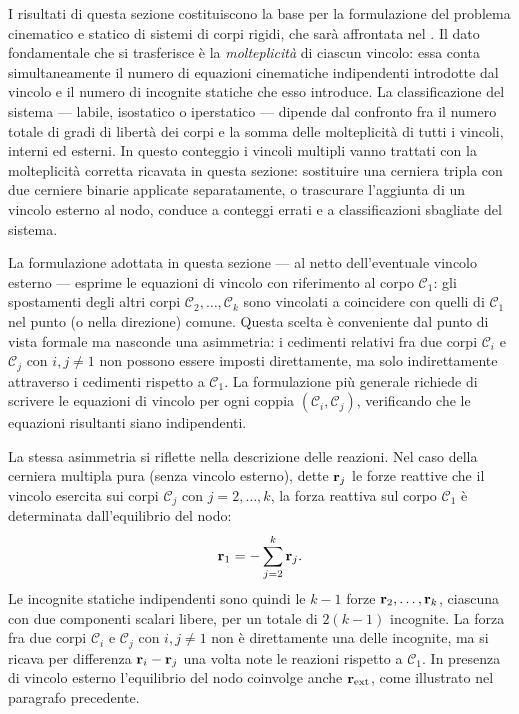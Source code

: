 \begin{oss}
	I risultati di questa sezione costituiscono la base
	per la formulazione del problema cinematico e statico
	di sistemi di corpi rigidi, che sarà affrontata nel
	. Il dato fondamentale
	che si trasferisce è la \emph{molteplicità} di ciascun
	vincolo: essa conta simultaneamente il numero di
	equazioni cinematiche indipendenti introdotte dal
	vincolo e il numero di incognite statiche che esso
	introduce. La classificazione del sistema --- labile,
	isostatico o iperstatico --- dipende dal confronto fra
	il numero totale di gradi di libertà dei corpi e la
	somma delle molteplicità di tutti i vincoli, interni
	ed esterni. In questo conteggio i vincoli multipli vanno
	trattati con la molteplicità corretta ricavata in
	questa sezione: sostituire una cerniera tripla con due
	cerniere binarie applicate separatamente, o trascurare
	l'aggiunta di un vincolo esterno al nodo, conduce a
	conteggi errati e a classificazioni sbagliate del
	sistema.
\end{oss}

\begin{oss}
	La formulazione adottata in questa sezione --- al netto
	dell'eventuale vincolo esterno --- esprime le equazioni
	di vincolo con riferimento al corpo $\mathcal{C}_1$:
	gli spostamenti degli altri corpi
	$\mathcal{C}_2, \ldots, \mathcal{C}_k$ sono vincolati
	a coincidere con quelli di $\mathcal{C}_1$ nel punto
	(o nella direzione) comune. Questa scelta è conveniente
	dal punto di vista formale ma nasconde una asimmetria:
	i cedimenti relativi fra due corpi $\mathcal{C}_i$ e
	$\mathcal{C}_j$ con $i,j \neq 1$ non possono essere
	imposti direttamente, ma solo indirettamente attraverso
	i cedimenti rispetto a $\mathcal{C}_1$. La formulazione
	più generale richiede di scrivere le equazioni di
	vincolo per ogni coppia $(\mathcal{C}_i, \mathcal{C}_j)$,
	verificando che le equazioni risultanti siano
	indipendenti.
	
	La stessa asimmetria si riflette nella descrizione delle
	reazioni. Nel caso della cerniera multipla pura (senza
	vincolo esterno), dette $\mathbf{r}_j$ le forze reattive che il
	vincolo esercita sui corpi $\mathcal{C}_j$ con $j = 2,
	\ldots, k$, la forza reattiva sul corpo $\mathcal{C}_1$
	è determinata dall'equilibrio del nodo:
	\begin{equation}
		\mathbf{r}_1 = -\sum_{j=2}^{k} \mathbf{r}_j.
	\end{equation}
	Le incognite statiche indipendenti sono quindi le $k-1$
	forze $\mathbf{r}_2, \ldots, \mathbf{r}_k$, ciascuna con due
	componenti scalari libere, per un totale di $2(k-1)$
	incognite. La forza fra due corpi $\mathcal{C}_i$ e
	$\mathcal{C}_j$ con $i,j \neq 1$ non è direttamente una
	delle incognite, ma si ricava per differenza
	$\mathbf{r}_i - \mathbf{r}_j$ una volta note le reazioni rispetto a
	$\mathcal{C}_1$. In presenza di vincolo esterno
	l'equilibrio del nodo coinvolge anche $\mathbf{r}_\text{ext}$,
	come illustrato nel paragrafo precedente.
\end{oss}


